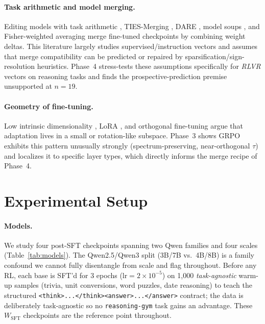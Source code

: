 \documentclass{article}
\newcommand{\Wsft}{W_{\mathrm{SFT}}}
\begin{document}
\paragraph{Task arithmetic and model merging.} Editing models with task arithmetic
\citep{ilharco2023editing}, TIES-Merging \citep{yadav2023ties}, DARE \citep{yu2024dare},
model soups \citep{wortsman2022modelsoups}, and Fisher-weighted averaging
\citep{matena2022fisher} merge fine-tuned checkpoints by combining weight deltas. This
literature largely studies supervised/instruction vectors and assumes that merge compatibility
can be predicted or repaired by sparsification/sign-resolution heuristics. Phase~4 stress-tests
these assumptions specifically for \emph{RLVR} vectors on reasoning tasks and finds the
prospective-prediction premise unsupported at $n{=}19$.

\paragraph{Geometry of fine-tuning.} Low intrinsic dimensionality \citep{aghajanyan2021intrinsic},
LoRA \citep{hu2022lora}, and orthogonal fine-tuning \citep{qiu2023oft} argue that adaptation
lives in a small or rotation-like subspace. Phase~3 shows GRPO exhibits this pattern unusually
strongly (spectrum-preserving, near-orthogonal $\tau$) and localizes it to specific layer types,
which directly informs the merge recipe of Phase~4.

\section{Experimental Setup}
\label{sec:setup}
\paragraph{Models.} We study four post-SFT checkpoints spanning two Qwen families and four scales
(Table~\ref{tab:models}). The Qwen2.5/Qwen3 split (3B/7B vs.\ 4B/8B) is a family confound we cannot
fully disentangle from scale and flag throughout. Before any RL, each base is SFT'd for 3 epochs
($\mathrm{lr}{=}2\!\times\!10^{-5}$) on 1{,}000 \emph{task-agnostic} warm-up samples (trivia, unit
conversions, word puzzles, date reasoning) to teach the structured
\texttt{<think>...</think><answer>...</answer>} contract; the data is deliberately task-agnostic so
no \texttt{reasoning-gym} task gains an advantage. These $\Wsft$ checkpoints are the reference point
throughout.
\end{document}
